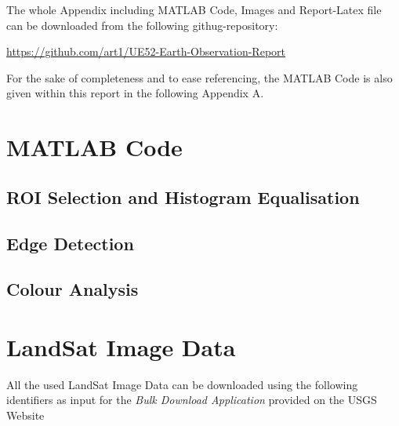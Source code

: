 The whole Appendix including MATLAB Code, Images and Report-Latex file    can be downloaded from the following githug-repository:

\begin{center}
	\url{https://github.com/art1/UE52-Earth-Observation-Report}
\end{center}

For the sake of completeness and to ease referencing, the MATLAB Code is also given within this report in the following Appendix A.

\section{MATLAB Code}
\label{Appendix A}

\subsection{ROI Selection and Histogram Equalisation}
\label{selectROI}


\subsection{Edge Detection}
\label{edgeDetection}


\subsection{Colour Analysis}
\label{colouranalysis}


\section{LandSat Image Data}
\label{Appendix B}
All the used LandSat Image Data can be downloaded using the following identifiers as input for the \textit{Bulk Download Application} provided on the USGS Website



